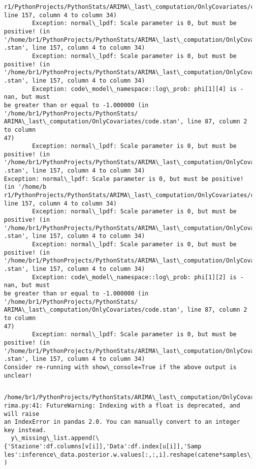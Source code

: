 \documentclass[11pt]{article}
\begin{document}
\begin{Verbatim}[commandchars=\\\{\}]
r1/PythonProjects/PythonStats/ARIMA\_last\_computation/OnlyCovariates/code.stan',
line 157, column 4 to column 34)
        Exception: normal\_lpdf: Scale parameter is 0, but must be positive! (in 
'/home/br1/PythonProjects/PythonStats/ARIMA\_last\_computation/OnlyCovariates/code
.stan', line 157, column 4 to column 34)
        Exception: normal\_lpdf: Scale parameter is 0, but must be positive! (in 
'/home/br1/PythonProjects/PythonStats/ARIMA\_last\_computation/OnlyCovariates/code
.stan', line 157, column 4 to column 34)
        Exception: code\_model\_namespace::log\_prob: phi[1][4] is -nan, but must
be greater than or equal to -1.000000 (in '/home/br1/PythonProjects/PythonStats/
ARIMA\_last\_computation/OnlyCovariates/code.stan', line 87, column 2 to column
47)
        Exception: normal\_lpdf: Scale parameter is 0, but must be positive! (in 
'/home/br1/PythonProjects/PythonStats/ARIMA\_last\_computation/OnlyCovariates/code
.stan', line 157, column 4 to column 34)
Exception: normal\_lpdf: Scale parameter is 0, but must be positive! (in '/home/b
r1/PythonProjects/PythonStats/ARIMA\_last\_computation/OnlyCovariates/code.stan',
line 157, column 4 to column 34)
        Exception: normal\_lpdf: Scale parameter is 0, but must be positive! (in 
'/home/br1/PythonProjects/PythonStats/ARIMA\_last\_computation/OnlyCovariates/code
.stan', line 157, column 4 to column 34)
        Exception: normal\_lpdf: Scale parameter is 0, but must be positive! (in 
'/home/br1/PythonProjects/PythonStats/ARIMA\_last\_computation/OnlyCovariates/code
.stan', line 157, column 4 to column 34)
        Exception: code\_model\_namespace::log\_prob: phi[1][2] is -nan, but must
be greater than or equal to -1.000000 (in '/home/br1/PythonProjects/PythonStats/
ARIMA\_last\_computation/OnlyCovariates/code.stan', line 87, column 2 to column
47)
        Exception: normal\_lpdf: Scale parameter is 0, but must be positive! (in 
'/home/br1/PythonProjects/PythonStats/ARIMA\_last\_computation/OnlyCovariates/code
.stan', line 157, column 4 to column 34)
Consider re-running with show\_console=True if the above output is unclear!
    \end{Verbatim}

    \begin{Verbatim}[commandchars=\\\{\}]

    \end{Verbatim}

    \begin{Verbatim}[commandchars=\\\{\}]
/home/br1/PythonProjects/PythonStats/ARIMA\_last\_computation/OnlyCovariates/fit\_a
rima.py:41: FutureWarning: Indexing with a float is deprecated, and will raise
an IndexError in pandas 2.0. You can manually convert to an integer key instead.
  y\_missing\_list.append(\{'Stazione':df.columns[v[i]],'Data':df.index[u[i]],'Samp
les':inference\_data.posterior.w.values[:,:,i].reshape(catene*samples\_per\_chain)\}
)
    \end{Verbatim}
\end{document}
